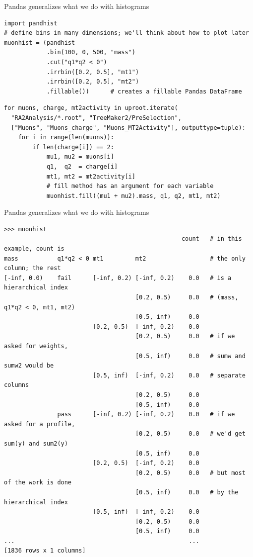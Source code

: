 \documentclass[aspectratio=169]{beamer}
\begin{document}
\begin{frame}[fragile]{Pandas generalizes what we do with histograms}
\small

\begin{verbatim}
import pandhist
# define bins in many dimensions; we'll think about how to plot later
muonhist = (pandhist
            .bin(100, 0, 500, "mass")
            .cut("q1*q2 < 0")
            .irrbin([0.2, 0.5], "mt1")
            .irrbin([0.2, 0.5], "mt2")
            .fillable())      # creates a fillable Pandas DataFrame
\end{verbatim}

\begin{verbatim}
for muons, charge, mt2activity in uproot.iterate(
  "RA2Analysis/*.root", "TreeMaker2/PreSelection",
  ["Muons", "Muons_charge", "Muons_MT2Activity"], outputtype=tuple):
    for i in range(len(muons)):
        if len(charge[i]) == 2:
            mu1, mu2 = muons[i]
            q1,  q2  = charge[i]
            mt1, mt2 = mt2activity[i]
            # fill method has an argument for each variable
            muonhist.fill((mu1 + mu2).mass, q1, q2, mt1, mt2)
\end{verbatim}
\end{frame}

\begin{frame}[fragile]{Pandas generalizes what we do with histograms}
\scriptsize
\begin{verbatim}
>>> muonhist
                                                  count   # in this example, count is
mass           q1*q2 < 0 mt1         mt2                  # the only column; the rest
[-inf, 0.0)    fail      [-inf, 0.2) [-inf, 0.2)    0.0   # is a hierarchical index
                                     [0.2, 0.5)     0.0   # (mass, q1*q2 < 0, mt1, mt2)
                                     [0.5, inf)     0.0
                         [0.2, 0.5)  [-inf, 0.2)    0.0
                                     [0.2, 0.5)     0.0   # if we asked for weights,
                                     [0.5, inf)     0.0   # sumw and sumw2 would be
                         [0.5, inf)  [-inf, 0.2)    0.0   # separate columns
                                     [0.2, 0.5)     0.0
                                     [0.5, inf)     0.0
               pass      [-inf, 0.2) [-inf, 0.2)    0.0   # if we asked for a profile,
                                     [0.2, 0.5)     0.0   # we'd get sum(y) and sum2(y)
                                     [0.5, inf)     0.0
                         [0.2, 0.5)  [-inf, 0.2)    0.0
                                     [0.2, 0.5)     0.0   # but most of the work is done
                                     [0.5, inf)     0.0   # by the hierarchical index
                         [0.5, inf)  [-inf, 0.2)    0.0
                                     [0.2, 0.5)     0.0
                                     [0.5, inf)     0.0
...                                                 ...
[1836 rows x 1 columns]
\end{verbatim}
\end{frame}
\end{document}
